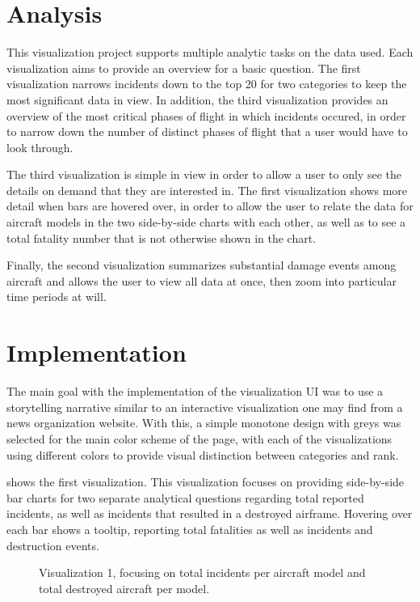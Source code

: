 \documentclass{article}
\begin{document}
  \section{Analysis}
    This visualization project supports multiple analytic tasks on the data used. Each visualization aims to provide an overview for a basic question. The first visualization narrows incidents down to the top 20 for two categories to keep the most significant data in view. In addition, the third visualization provides an overview of the most critical phases of flight in which incidents occured, in order to narrow down the number of distinct phases of flight that a user would have to look through.

    The third visualization is simple in view in order to allow a user to only see the details on demand that they are interested in. The first visualization shows more detail when bars are hovered over, in order to allow the user to relate the data for aircraft models in the two side-by-side charts with each other, as well as to see a total fatality number that is not otherwise shown in the chart.

    Finally, the second visualization summarizes substantial damage events among aircraft and allows the user to view all data at once, then zoom into particular time periods at will.

  \section{Implementation}
    The main goal with the implementation of the visualization UI was to use a storytelling narrative similar to an interactive visualization one may find from a news organization website. With this, a simple monotone design with greys was selected for the main color scheme of the page, with each of the visualizations using different colors to provide visual distinction between categories and rank.

     shows the first visualization. This visualization focuses on providing side-by-side bar charts for two separate analytical questions regarding total reported incidents, as well as incidents that resulted in a destroyed airframe. Hovering over each bar shows a tooltip, reporting total fatalities as well as incidents and destruction events.

    \begin{figure}[htb]
      \centering
      \caption{Visualization 1, focusing on total incidents per aircraft model and total destroyed aircraft per model.}
      \label{fig:v1}
    \end{figure}
\end{document}

